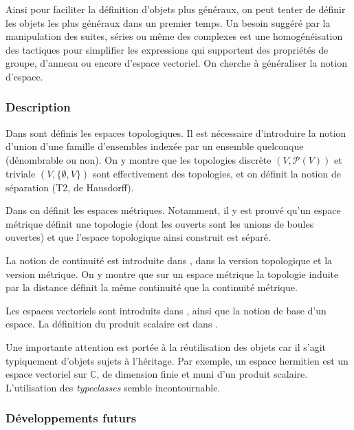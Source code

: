 Ainsi pour faciliter la définition d'objets plus généraux, on peut tenter de définir les objets les plus généraux dans un premier temps. Un besoin suggéré par la manipulation des suites, séries ou même des complexes est une homogénéisation des tactiques pour simplifier les expressions qui supportent des propriétés de groupe, d'anneau ou encore d'espace vectoriel. On cherche à généraliser la notion d'espace.

\subsubsection{Description}

Dans  sont définis les espaces topologiques. Il est nécessaire d'introduire la notion d'union d'une famille d'ensembles indexée par un ensemble quelconque (dénombrable ou non). On y montre que les topologies discrète $(V,\mathcal{P}(V))$ et triviale $(V,\{\emptyset,V\})$ sont effectivement des topologies, et on définit la notion de séparation (T2, de Hausdorff).

Dans  on définit les espaces métriques. Notamment, il y est prouvé qu'un espace métrique définit une topologie (dont les ouverts sont les unions de boules ouvertes) et que l'espace topologique ainsi construit est séparé.

La notion de continuité est introduite dans , dans la version topologique et la version métrique. On y montre que sur un espace métrique la topologie induite par la distance définit la même continuité que la continuité métrique.

Les espaces vectoriels sont introduits dans , ainsi que la notion de base d'un espace. La définition du produit scalaire est dans .

Une importante attention est portée à la réutilisation des objets car il s'agit typiquement d'objets sujets à l'héritage. Par exemple, un espace hermitien est un espace vectoriel sur $\mathbb{C}$, de dimension finie et muni d'un produit scalaire. L'utilisation des \emph{typeclasses} semble incontournable.


\subsubsection{Développements futurs}

